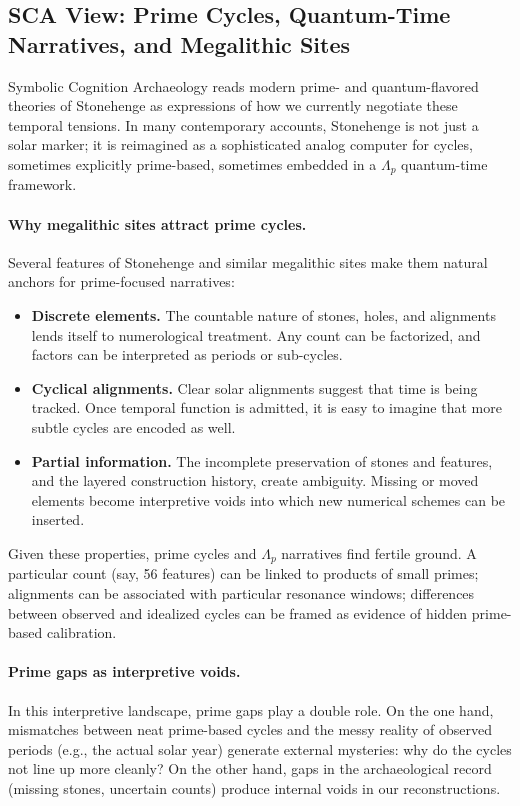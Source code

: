 \documentclass[12]{amsart}
\theoremstyle{plain}
\begin{document}
\subsection{SCA View: Prime Cycles, Quantum-Time Narratives, and Megalithic Sites}

Symbolic Cognition Archaeology reads modern prime- and quantum-flavored theories of Stonehenge as expressions of how we currently negotiate these temporal tensions. In many contemporary accounts, Stonehenge is not just a solar marker; it is reimagined as a sophisticated analog computer for cycles, sometimes explicitly prime-based, sometimes embedded in a $\Lambda_p$ quantum-time framework.

\paragraph{Why megalithic sites attract prime cycles.} Several features of Stonehenge and similar megalithic sites make them natural anchors for prime-focused narratives:

\begin{itemize}
  \item \textbf{Discrete elements.} The countable nature of stones, holes, and alignments lends itself to numerological treatment. Any count can be factorized, and factors can be interpreted as periods or sub-cycles.
  \item \textbf{Cyclical alignments.} Clear solar alignments suggest that time is being tracked. Once temporal function is admitted, it is easy to imagine that more subtle cycles are encoded as well.
  \item \textbf{Partial information.} The incomplete preservation of stones and features, and the layered construction history, create ambiguity. Missing or moved elements become interpretive voids into which new numerical schemes can be inserted.
\end{itemize}

Given these properties, prime cycles and $\Lambda_p$ narratives find fertile ground. A particular count (say, 56 features) can be linked to products of small primes; alignments can be associated with particular resonance windows; differences between observed and idealized cycles can be framed as evidence of hidden prime-based calibration.

\paragraph{Prime gaps as interpretive voids.} In this interpretive landscape, prime gaps play a double role. On the one hand, mismatches between neat prime-based cycles and the messy reality of observed periods (e.g., the actual solar year) generate external mysteries: why do the cycles not line up more cleanly? On the other hand, gaps in the archaeological record (missing stones, uncertain counts) produce internal voids in our reconstructions.
\end{document}
